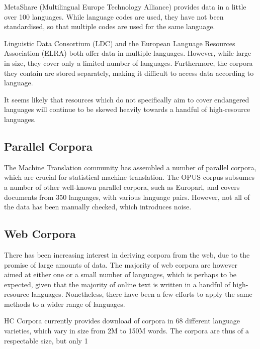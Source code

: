MetaShare (Multilingual Europe Technology Alliance) provides data in a little over 100 languages. While language codes are used, they have not been standardised, so that multiple codes are used for the same language.

Linguistic Data Consortium (LDC) and the European Language Resources Association (ELRA) both offer data in multiple languages.  However, while large in size, they cover only a limited number of languages.  Furthermore, the corpora they contain are stored separately, making it difficult to access data according to language.

It seems likely that resources which do not specifically aim to cover endangered languages will continue to be skewed heavily towards a handful of high-resource languages.

\subsection{Parallel Corpora}

The Machine Translation community has assembled a number of parallel corpora, which are crucial for statistical machine translation. The OPUS corpus \cite{tiedemann2012opus} subsumes a number of other well-known parallel corpora, such as Europarl, and covers documents from 350 languages, with various language pairs.  However, not all of the data has been manually checked, which introduces noise.

\subsection{Web Corpora}

There has been increasing interest in deriving corpora from the web, due to the promise of large amounts of data.  The majority of web corpora are however aimed at either one or a small number of languages, which is perhaps to be expected, given that the majority of online text is written in a handful of high-resource languages.  Nonetheless, there have been a few efforts to apply the same methods to a wider range of languages.

HC Corpora currently provides download of corpora in 68 different language varieties, which vary in size from 2M to 150M words. The corpora are thus of a respectable size, but only 1%

